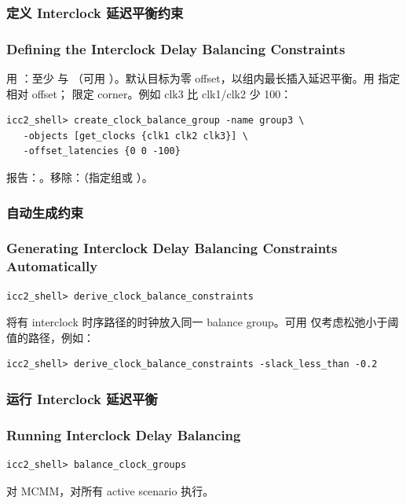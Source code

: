 \subsubsection{定义 Interclock 延迟平衡约束}
\subsubsection*{Defining the Interclock Delay Balancing Constraints}

用 ：至少  与 （可用 ）。默认目标为零 offset，以组内最长插入延迟平衡。用  指定相对 offset； 限定 corner。例如 clk3 比 clk1/clk2 少 100：
\begin{lstlisting}
icc2_shell> create_clock_balance_group -name group3 \
   -objects [get_clocks {clk1 clk2 clk3}] \
   -offset_latencies {0 0 -100}
\end{lstlisting}
报告：。移除：（指定组或 ）。

\subsubsection{自动生成约束}
\subsubsection*{Generating Interclock Delay Balancing Constraints Automatically}

\begin{lstlisting}
icc2_shell> derive_clock_balance_constraints
\end{lstlisting}
将有 interclock 时序路径的时钟放入同一 balance group。可用  仅考虑松弛小于阈值的路径，例如：
\begin{lstlisting}
icc2_shell> derive_clock_balance_constraints -slack_less_than -0.2
\end{lstlisting}

\subsubsection{运行 Interclock 延迟平衡}
\subsubsection*{Running Interclock Delay Balancing}

\begin{lstlisting}
icc2_shell> balance_clock_groups
\end{lstlisting}
对 MCMM，对所有 active scenario 执行。

